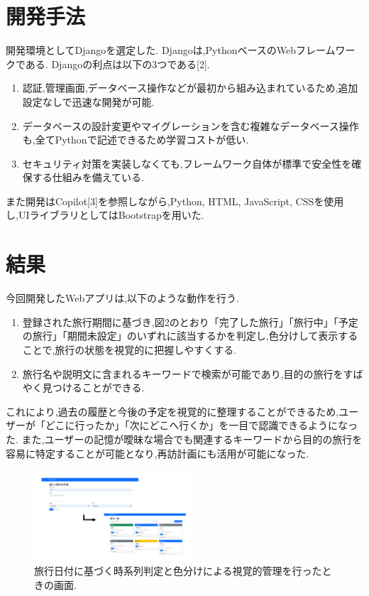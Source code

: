 \documentclass[a4j,twocolumn]{jsarticle}
\begin{document}
\section{開発手法}
\label{sec:org268d78b}
開発環境としてDjangoを選定した.
Djangoは,PythonベースのWebフレームワークである.
Djangoの利点は以下の3つである[2].
\begin{enumerate}
\item 認証,管理画面,データベース操作などが最初から組み込まれているため,追加設定なしで迅速な開発が可能.
\item データベースの設計変更やマイグレーションを含む複雑なデータベース操作も,全てPythonで記述できるため学習コストが低い.
\item セキュリティ対策を実装しなくても,フレームワーク自体が標準で安全性を確保する仕組みを備えている.
\end{enumerate}
また開発はCopilot[3]を参照しながら,Python, HTML, JavaScript, CSSを使用し,UIライブラリとしてはBootstrapを用いた.

\section{結果}
\label{sec:orgbf51101}
今回開発したWebアプリは,以下のような動作を行う.

\begin{enumerate}
\item 登録された旅行期間に基づき,図2のとおり「完了した旅行」「旅行中」「予定の旅行」「期間未設定」のいずれに該当するかを判定し,色分けして表示することで,旅行の状態を視覚的に把握しやすくする.
\item 旅行名や説明文に含まれるキーワードで検索が可能であり,目的の旅行をすばやく見つけることができる.
\end{enumerate}
これにより,過去の履歴と今後の予定を視覚的に整理することができるため,ユーザーが「どこに行ったか」「次にどこへ行くか」を一目で認識できるようになった.
また,ユーザーの記憶が曖昧な場合でも関連するキーワードから目的の旅行を容易に特定することが可能となり,再訪計画にも活用が可能になった.

\begin{figure}[htbp]
\centering
\includegraphics[width=6cm]{./figs/trip1.png}
\caption{\label{fig:org5a6a668}旅行日付に基づく時系列判定と色分けによる視覚的管理を行ったときの画面.}
\end{figure}
\end{document}
